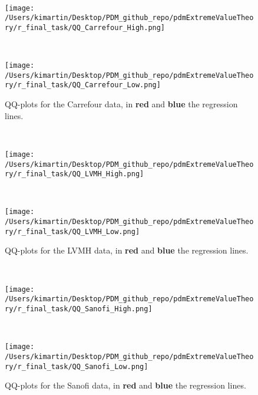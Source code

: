 \\
\begin{figure}[h!]
	\centering
	\begin{minipage}[b]{0.4\textwidth}
		\centering
		\texttt{[image: /Users/kimartin/Desktop/PDM\_github\_repo/pdmExtremeValueTheory/r\_final\_task/QQ\_Carrefour\_High.png]}
		\label{fig:QQCarrefour1}
	\end{minipage}
	~
	\begin{minipage}[b]{0.4\textwidth}
		\centering
		\texttt{[image: /Users/kimartin/Desktop/PDM\_github\_repo/pdmExtremeValueTheory/r\_final\_task/QQ\_Carrefour\_Low.png]}
		\label{fig:QQCarrefour2}
	\end{minipage}
	\caption{QQ-plots for the Carrefour data, in \textbf{red} and \textbf{blue} the regression lines.}
\end{figure}
\\
\begin{figure}[h!]
	\centering
	\begin{minipage}[b]{0.4\textwidth}
		\centering
		\texttt{[image: /Users/kimartin/Desktop/PDM\_github\_repo/pdmExtremeValueTheory/r\_final\_task/QQ\_LVMH\_High.png]}
		\label{fig:QQLVMH1}
	\end{minipage}
	~
	\begin{minipage}[b]{0.4\textwidth}
		\centering
		\texttt{[image: /Users/kimartin/Desktop/PDM\_github\_repo/pdmExtremeValueTheory/r\_final\_task/QQ\_LVMH\_Low.png]}
		\label{fig:QQLVMH2}
	\end{minipage}
	\caption{QQ-plots for the LVMH data, in \textbf{red} and \textbf{blue} the regression lines.}
\end{figure}
\\
\begin{figure}[h!]
	\centering
	\begin{minipage}[b]{0.4\textwidth}
		\centering
		\texttt{[image: /Users/kimartin/Desktop/PDM\_github\_repo/pdmExtremeValueTheory/r\_final\_task/QQ\_Sanofi\_High.png]}
		\label{fig:QQSanofi1}
	\end{minipage}
	~
	\begin{minipage}[b]{0.4\textwidth}
		\centering
		\texttt{[image: /Users/kimartin/Desktop/PDM\_github\_repo/pdmExtremeValueTheory/r\_final\_task/QQ\_Sanofi\_Low.png]}
		\label{fig:QQSanofi2}
	\end{minipage}
	\caption{QQ-plots for the Sanofi data, in \textbf{red} and \textbf{blue} the regression lines.}
\end{figure}
\clearpage
